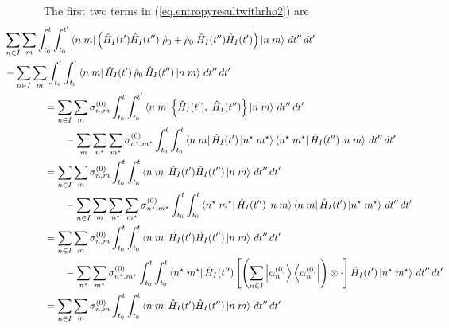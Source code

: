 The first two terms in (\ref{eq.entropyresultwithrho2}) are
\begin{align*}
&\hspace{-4em} \sum_{n \in I} \sum_m\int_{t_0}^t \int_{t_0}^{t^\prime} \bbra{n}{m} \left( \op{H}_I (t^\prime) \op{H}_I(t^{\prime\prime}) \;\op{\rho}_0 + \op{\rho}_0\; \op{H}_I (t^{\prime\prime}) \op{H}_I(t^{\prime}) \right) \bket{n}{m}\,dt^{\prime\prime}\,dt^\prime \\
&\hspace{-4em}- \sum_{n \in I}\sum_m\int_{t_0}^t \int_{t_0}^{t} \bbra{n}{m}\op{H}_I (t^\prime) \,\op{\rho}_0\, \op{H}_I (t^{\prime\prime})\bket{n}{m}\,dt^{\prime\prime}\,dt^\prime \\
&= \sum_{n \in I}\sum_m\sigma_{n,m}^{(0)} \int_{t_0}^t \int_{t_0}^{t^\prime} \bbra{n}{m} \left\{\op{H}_I (t^\prime),\; \op{H}_I(t^{\prime\prime}) \right\} \bket{n}{m}\,dt^{\prime\prime}\,dt^\prime \\
&\hspace{2em} -\sum_m\sum_{n^\star} \sum_{m^\star} \sigma_{n^\star,m^\star}^{(0)}\int_{t_0}^t \int_{t_0}^{t} \bbra{n}{m}\op{H}_I (t^\prime) \bket{n^\star}{m^\star}\bbra{n^\star}{m^\star} \op{H}_I (t^{\prime\prime})\bket{n}{m}\,dt^{\prime\prime}\,dt^\prime \\
&=\sum_{n \in I}\sum_m \sigma_{n,m}^{(0)} \int_{t_0}^t \int_{t_0}^{t} \bbra{n}{m}\op{H}_I (t^\prime) \op{H}_I(t^{\prime\prime}) \bket{n}{m}\,dt^{\prime\prime}\,dt^\prime \\
&\hspace{2em}-\sum_{n \in I}\sum_m\sum_{n^\star} \sum_{m^\star} \sigma_{n^\star,m^\star}^{(0)}\int_{t_0}^t \int_{t_0}^{t} \bbra{n^\star}{m^\star} \op{H}_I (t^{\prime\prime})\bket{n}{m} \bbra{n}{m}\op{H}_I (t^\prime) \bket{n^\star}{m^\star}\,dt^{\prime\prime}\,dt^\prime \\
&= \sum_{n \in I}\sum_m\sigma_{n,m}^{(0)} \int_{t_0}^t \int_{t_0}^{t} \bbra{n}{m}\op{H}_I (t^\prime) \op{H}_I(t^{\prime\prime}) \bket{n}{m}\,dt^{\prime\prime}\,dt^\prime \\
&\hspace{2em}-\sum_{n^\star} \sum_{m^\star} \sigma_{n^\star,m^\star}^{(0)}\int_{t_0}^t \int_{t_0}^{t} \bbra{n^\star}{m^\star} \op{H}_I (t^{\prime\prime})\left[\left(\sum_{n\in I} \ket{\alpha_n^{(0)}}\bra{\alpha_n^{(0)}}\right)\otimes\cdot\right]\op{H}_I (t^\prime) \bket{n^\star}{m^\star}\,dt^{\prime\prime}\,dt^\prime \\
&=\sum_{n \in I}\sum_m \sigma_{n,m}^{(0)} \int_{t_0}^t \int_{t_0}^{t} \bbra{n}{m}\op{H}_I (t^\prime) \op{H}_I(t^{\prime\prime}) \bket{n}{m}\,dt^{\prime\prime}\,dt^\prime \\

\end{align*}
